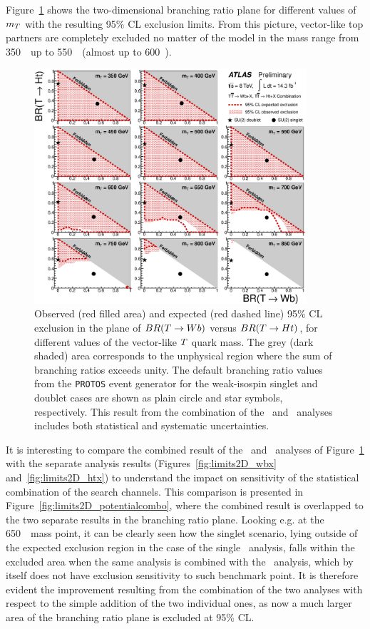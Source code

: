 Figure~\ref{fig:limits2D_combo} shows the two-dimensional branching ratio plane for 
different values of $m_{\T}$ with the  resulting 95\% CL exclusion limits. 
From this picture, vector-like top partners are completely excluded
no matter of the model in the mass range from 350~\gev\ up to 550~\gev\ 
(almost up to 600~\gev).
\begin{figure}[h!bt]
\centering
\includegraphics[width=0.9\textwidth]{results/figures/lim_Scan2D_comb.eps}
\caption{
Observed (red filled area) and expected (red dashed line) 95\% CL exclusion in the plane of
$BR(\T \to Wb)$ versus $BR(\T \to Ht)$, for different values of the vector-like $\T$ quark mass.
The grey (dark shaded) area corresponds to the unphysical region where the sum of branching ratios exceeds unity. 
The default branching ratio values from the \texttt{PROTOS} event generator for the weak-isospin singlet and doublet cases 
are shown as plain circle and star symbols, respectively. This result  from the combination of
the \wbx\ and \htx\ analyses includes both statistical and systematic uncertainties.
\label{fig:limits2D_combo}}
\end{figure}
It is interesting to compare the 
combined result
of the \wbx\ and \htx\ analyses
of Figure~\ref{fig:limits2D_combo} 
with the separate analysis results (Figures~\ref{fig:limits2D_wbx} and~\ref{fig:limits2D_htx})
to understand the impact on sensitivity
of the statistical combination of
the search channels.
This comparison is presented in 
Figure~\ref{fig:limits2D_potentialcombo},
where the combined result is overlapped
to the two separate results in the branching ratio
plane.
Looking e.g. at the 650~\gev\ mass point,
it can be clearly seen how the singlet
scenario, lying outside of the expected exclusion
region in the case of the single \htx\ analysis,
falls within the excluded area when
the same analysis is combined with the
\wbx\ analysis, which by itself does not 
have exclusion sensitivity to such benchmark point.
It is therefore evident the improvement resulting from the 
combination of the two analyses with respect to the
simple addition of the two individual ones, 
as now a much larger area of the branching ratio plane
is excluded at 95\% CL.



